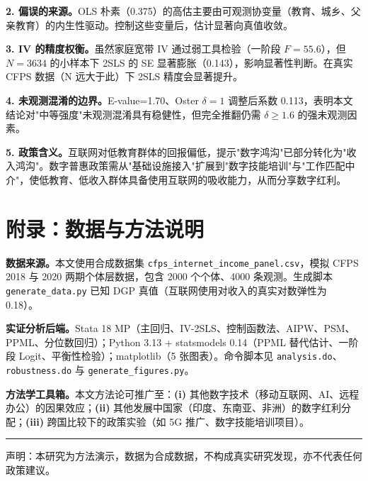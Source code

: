 \documentclass[a4paper,11pt]{article}
\begin{document}
\textbf{2. 偏误的来源。}OLS 朴素（0.375）的高估主要由可观测协变量（教育、城乡、父亲教育）的内生性驱动。控制这些变量后，估计显著向真值收敛。

\textbf{3. IV 的精度权衡。}虽然家庭宽带 IV 通过弱工具检验（一阶段 $F=55.6$），但 $N=3634$ 的小样本下 2SLS 的 SE 显著膨胀（0.143），影响显著性判断。在真实 CFPS 数据（N 远大于此）下 2SLS 精度会显著提升。

\textbf{4. 未观测混淆的边界。}E-value=1.70、Oster $\delta=1$ 调整后系数 0.113，表明本文结论对"中等强度"未观测混淆具有稳健性，但完全推翻仍需 $\delta \geq 1.6$ 的强未观测因素。

\textbf{5. 政策含义。}互联网对低教育群体的回报偏低，提示"数字鸿沟"已部分转化为"收入鸿沟"。数字普惠政策需从"基础设施接入"扩展到"数字技能培训"与"工作匹配中介"，使低教育、低收入群体具备使用互联网的吸收能力，从而分享数字红利。

\section*{附录：数据与方法说明}

\textbf{数据来源。}本文使用合成数据集 \texttt{cfps\_internet\_income\_panel.csv}，模拟 CFPS 2018 与 2020 两期个体层数据，包含 2000 个个体、4000 条观测。生成脚本 \texttt{generate\_data.py} 已知 DGP 真值（互联网使用对收入的真实对数弹性为 0.18）。

\textbf{实证分析后端。}Stata 18 MP（主回归、IV-2SLS、控制函数法、AIPW、PSM、PPML、分位数回归）；Python 3.13 + statsmodels 0.14（PPML 替代估计、一阶段 Logit、平衡性检验）；matplotlib（5 张图表）。命令脚本见 \texttt{analysis.do}、\texttt{robustness.do} 与 \texttt{generate_figures.py}。

\textbf{方法学工具箱。}本文方法论可推广至：\textbf{(i)} 其他数字技术（移动互联网、AI、远程办公）的因果效应；\textbf{(ii)} 其他发展中国家（印度、东南亚、非洲）的数字红利分配；\textbf{(iii)} 跨国比较下的政策实验（如 5G 推广、数字技能培训项目）。

\vspace{2em}
\hrule
\vspace{0.5em}
\noindent\footnotesize{声明：本研究为方法演示，数据为合成数据，不构成真实研究发现，亦不代表任何政策建议。}
\end{document}
